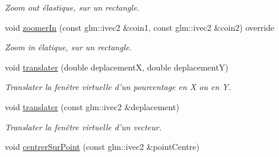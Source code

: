 \begin{DoxyCompactItemize}
\begin{DoxyCompactList}\small\item\em Zoom out élastique, sur un rectangle. \end{DoxyCompactList}\item 
\hypertarget{classvue_1_1_projection_perspective_a0e07e4c2a004b2ca2d0accd2ec1a7769}{void \hyperlink{classvue_1_1_projection_perspective_a0e07e4c2a004b2ca2d0accd2ec1a7769}{zoomer\-In} (const glm\-::ivec2 \&coin1, const glm\-::ivec2 \&coin2) override}\label{classvue_1_1_projection_perspective_a0e07e4c2a004b2ca2d0accd2ec1a7769}

\begin{DoxyCompactList}\small\item\em Zoom in élatique, sur un rectangle. \end{DoxyCompactList}\item 
\hypertarget{classvue_1_1_projection_perspective_ab92b91c7f6bfeb219570bb7d96122ba7}{void \hyperlink{classvue_1_1_projection_perspective_ab92b91c7f6bfeb219570bb7d96122ba7}{translater} (double deplacement\-X, double deplacement\-Y)}\label{classvue_1_1_projection_perspective_ab92b91c7f6bfeb219570bb7d96122ba7}

\begin{DoxyCompactList}\small\item\em Translater la fenêtre virtuelle d'un pourcentage en {\itshape X} ou en {\itshape Y}. \end{DoxyCompactList}\item 
\hypertarget{classvue_1_1_projection_perspective_a60b84f03118b91b2f0e6ce4770a18fc3}{void \hyperlink{classvue_1_1_projection_perspective_a60b84f03118b91b2f0e6ce4770a18fc3}{translater} (const glm\-::ivec2 \&deplacement)}\label{classvue_1_1_projection_perspective_a60b84f03118b91b2f0e6ce4770a18fc3}

\begin{DoxyCompactList}\small\item\em Translater la fenêtre virtuelle d'un vecteur. \end{DoxyCompactList}\item 
\hypertarget{classvue_1_1_projection_perspective_a1b640ba475bdcd9845beef5177d49dca}{void \hyperlink{classvue_1_1_projection_perspective_a1b640ba475bdcd9845beef5177d49dca}{centrer\-Sur\-Point} (const glm\-::ivec2 \&point\-Centre)}\label{classvue_1_1_projection_perspective_a1b640ba475bdcd9845beef5177d49dca}


\end{DoxyCompactItemize}
